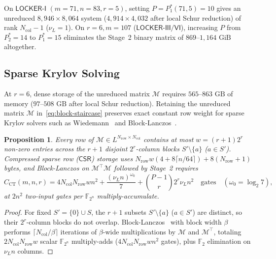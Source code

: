 \documentclass[11pt,a4paper]{article}
\newtheorem{proposition}[theorem]{Proposition}
\theoremstyle{definition}
\theoremstyle{remark}
\newcommand{\F}{\mathbb{F}}
\newcommand{\Ftwo}{\mathbb{F}_2}
\begin{document}
On $\mathsf{LOCKER\text{-}I}$ $(m=71, n=83, r=5)$, setting $P = P_1^*(71, 5) = 10$ gives an unreduced $8{,}946 \times 8{,}064$ system ($4{,}914 \times 4{,}032$ after local Schur reduction) of rank $N_{\text{col}} - 1$ ($\nu_L = 1$). On $r = 6, m = 107$ ($\mathsf{LOCKER\text{-}III/VI}$), increasing $P$ from $P_2^* = 14$ to $P_1^* = 15$ eliminates the Stage~2 binary matrix of $869\text{--}1{,}164\text{ GiB}$ altogether.

\subsection{Sparse Krylov Solving}
\label{subsec:ct-sparse}

At $r = 6$, dense storage of the unreduced matrix $\mathcal{M}$ requires $565\text{--}863\text{ GB}$ of memory ($97\text{--}508\text{ GB}$ after local Schur reduction). Retaining the unreduced matrix $\mathcal{M}$ in~\eqref{eq:block-staircase} preserves exact constant row weight for sparse Krylov solvers such as Wiedemann~\cite{Wiedemann86} and Block-Lanczos~\cite{Montgomery95}.

\begin{proposition}
\label{prop:sparse}
Every row of $\mathcal{M} \in L^{N_{\text{row}} \times N_{\text{col}}}$ contains at most $w = (r + 1) 2^r$ non-zero entries across the $r + 1$ disjoint $2^r$-column blocks $S' \setminus \{a\}$ ($a \in S'$). Compressed sparse row ($\mathsf{CSR}$) storage uses $N_{\text{row}} w (4 + 8 \lceil n/64 \rceil) + 8(N_{\text{row}} + 1)$ bytes, and Block-Lanczos on $\mathcal{M}^\top \mathcal{M}$ followed by Stage~2 requires
\begin{equation}
\label{eq:sparse-gates}
    C_{\text{CT}}(m, n, r) = 4 N_{\text{col}} N_{\text{row}} w n^2 + \frac{(\nu_L n)^{\omega_0}}{7} + \binom{P-1}{r} 2^r \nu_L n^2 \quad \text{gates} \quad (\omega_0 = \log_2 7),
\end{equation}
at $2 n^2$ two-input gates per $\F_{2^n}$ multiply-accumulate.
\end{proposition}

\begin{proof}
For fixed $S' = \{0\} \cup S$, the $r + 1$ subsets $S' \setminus \{a\}$ ($a \in S'$) are distinct, so their $2^r$-column blocks do not overlap. Block-Lanczos~\cite{Montgomery95} with block width $\beta$ performs $\lceil N_{\text{col}}/\beta \rceil$ iterations of $\beta$-wide multiplications by $\mathcal{M}$ and $\mathcal{M}^\top$, totaling $2 N_{\text{col}} N_{\text{row}} w$ scalar $\F_{2^n}$ multiply-adds ($4 N_{\text{col}} N_{\text{row}} w n^2$ gates), plus $\Ftwo$ elimination on $\nu_L n$ columns.
\end{proof}
\end{document}
